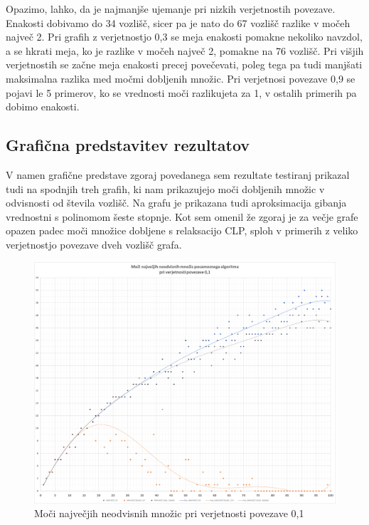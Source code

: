\documentclass[a4paper, 12 pt]{article}
\theoremstyle{definition}
\theoremstyle{plain}
\theoremstyle{remark}
\begin{document}
Opazimo, lahko, da je najmanjše ujemanje pri nizkih verjetnostih povezave. Enakosti dobivamo do 34 vozlišč, sicer pa je nato do 67 vozlišč razlike v močeh največ 2. Pri grafih z verjetnostjo 0,3 se meja enakosti pomakne nekoliko navzdol, a se hkrati meja, ko je razlike v močeh največ 2, pomakne na 76 vozlišč. Pri višjih verjetnostih se začne meja enakosti precej povečevati, poleg tega pa tudi manjšati maksimalna razlika med močmi dobljenih množic. Pri verjetnosi povezave 0,9 se pojavi le 5 primerov, ko se vrednosti moči razlikujeta za 1, v ostalih primerih pa dobimo enakosti.

\subsection{Grafična predstavitev rezultatov}

V namen grafične predstave zgoraj povedanega sem rezultate testiranj prikazal tudi na spodnjih treh grafih, ki nam prikazujejo moči dobljenih množic v odvisnosti od števila vozlišč. Na grafu je prikazana tudi aproksimacija gibanja vrednostni s polinomom šeste stopnje. Kot sem omenil že zgoraj je za večje grafe opazen padec moči množice dobljene s relaksacijo CLP, sploh v primerih z veliko verjetnostjo povezave dveh vozlišč grafa. 
\begin{figure}[H]
\centering
  \includegraphics[scale=0.28]{0,1 moci.png}
  \caption{Moči največjih neodvisnih množic pri verjetnosti povezave 0,1}
  \label{fig:moc0,1} 
\end{figure}
\end{document}
